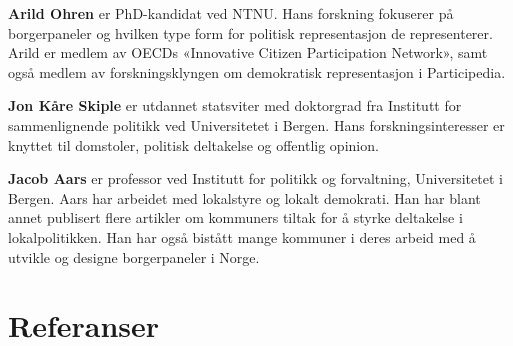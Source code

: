 \documentclass[
  12pt,
  a4paper, 12pt]{article}
\begin{document}
\textbf{Arild Ohren} er PhD-kandidat ved NTNU.
Hans forskning fokuserer på borgerpaneler og hvilken type form for politisk representasjon de representerer.
Arild er medlem av OECDs «Innovative Citizen Participation Network», samt også medlem av forskningsklyngen om demokratisk representasjon i Participedia.

\textbf{Jon Kåre Skiple} er utdannet statsviter med doktorgrad fra Institutt for sammenlignende politikk ved Universitetet i Bergen. Hans forskningsinteresser er knyttet til domstoler, politisk deltakelse og offentlig opinion.

\textbf{Jacob Aars} er professor ved Institutt for politikk og forvaltning, Universitetet i Bergen.
Aars har arbeidet med lokalstyre og lokalt demokrati.
Han har blant annet publisert flere artikler om kommuners tiltak for å styrke deltakelse i lokalpolitikken.
Han har også bistått mange kommuner i deres arbeid med å utvikle og designe borgerpaneler i Norge.

\newpage

\hypertarget{bibliography}{%
\section*{Referanser}\label{bibliography}}
\end{document}
